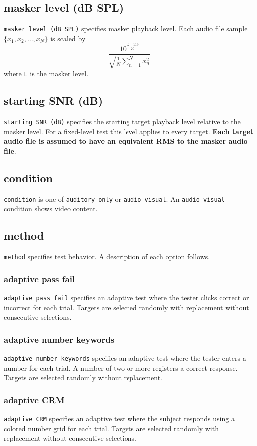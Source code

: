 \documentclass[11pt,pdftex,letterpaper]{article}
\begin{document}
\subsection{masker level (dB SPL)}
\texttt{masker level (dB SPL)} specifies masker playback level. Each audio file sample ${\displaystyle \{x_{1}, x_{2}, \dots , x_{N}\}}$ is scaled by
\begin{equation}
 \frac{10^{\frac{L-119}{20}}}{\sqrt{\frac{1}{N}\sum_{n=1}^{N}x_{n}^{2}}}\label{eq:masker-scale}
\end{equation}
where \texttt{L} is the masker level.
\subsection{starting SNR (dB)}
\texttt{starting SNR (dB)} specifies the starting target playback level relative to the masker level. For a fixed-level test this level applies to every target. \textbf{Each target audio file is assumed to have an equivalent RMS to the masker audio file}.
\subsection{condition}
\texttt{condition} is one of \texttt{auditory-only} or \texttt{audio-visual}. An \texttt{audio-visual} condition shows video content.
\subsection{method}
\texttt{method} specifies test behavior. A description of each option follows.
\subsubsection{adaptive pass fail}
\texttt{adaptive pass fail} specifies an adaptive test where the tester clicks correct or incorrect for each trial. Targets are selected randomly with replacement without consecutive selections.
\subsubsection{adaptive number keywords}
\texttt{adaptive number keywords} specifies an adaptive test where the tester enters a number for each trial. A number of two or more registers a correct response. Targets are selected randomly without replacement.
\subsubsection{adaptive CRM}
\texttt{adaptive CRM} specifies an adaptive test where the subject responds using a colored number grid for each trial. Targets are selected randomly with replacement without consecutive selections.
\end{document}
